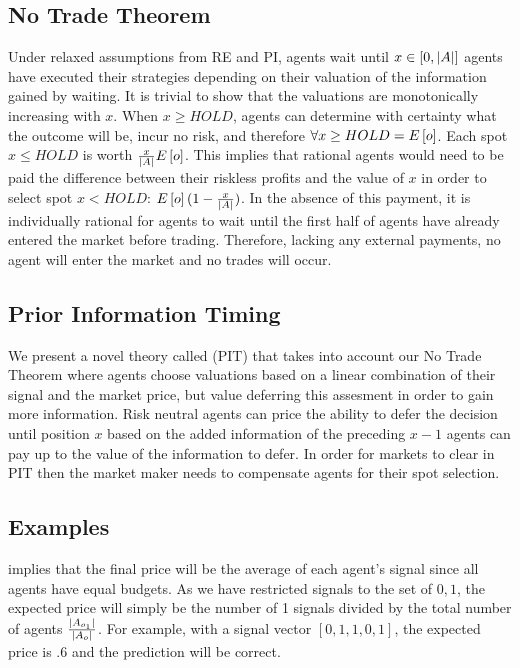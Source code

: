 \subsection{No Trade Theorem}
Under relaxed assumptions from RE and PI, agents wait until $x \in \left[0, |A| \right]$ agents have executed
their strategies depending on their valuation of the information gained by waiting. It is trivial to show that 
the valuations are monotonically increasing with $x$. When $x \geq HOLD$, agents can 
determine with certainty what the outcome will be, incur no risk, and therefore $\forall x \geq HOLD = E\left[o\right]$.
Each spot  $x \leq HOLD$ is worth $\frac{x}{|A|} 
E\left[o\right]$. This implies that rational agents
would need to be paid the difference between their riskless profits and the value of $x$ in order to select spot $x < HOLD$: $E\left[o\right](1 - \frac{x}{|A|})$. In the absence of this payment, it is individually rational for agents to wait until the first half of agents have already entered the market before trading. Therefore, lacking any external payments, no agent will enter the market and no
trades will occur.

\subsection{Prior Information Timing}
We present a novel theory called  (PIT) that takes into account our No Trade
Theorem where agents choose valuations based on a linear combination of their signal and the market
price, but value deferring this assesment in order to gain more information. Risk neutral agents can
price the ability to defer the decision until position $x$ based on the added information of the 
preceding $x-1$ agents can pay up to the value of the information to defer. In order for markets
to clear in PIT then the market maker needs to compensate agents for their spot selection.\\

\subsection{Examples}
 implies that the final price will be the average of each agent's signal since all agents have equal budgets. As we have restricted signals to the set of ${0,1}$, the expected price will simply be the number of 1 signals divided by the total number of agents $\frac{|A_{o_1}|}{|A_o|}$.  For example, with a signal vector $\left[0,1,1,0,1\right]$, the expected price is .6 and the prediction will be correct. \\


